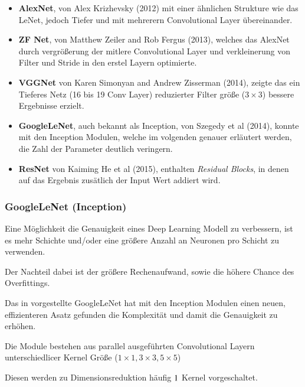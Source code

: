 \begin{itemize}
    \item \textbf{AlexNet}, von Alex Krizhevsky (2012) mit einer 
        ähnlichen Strukture wie das LeNet, jedoch Tiefer und 
        mit mehrerern Convolutional Layer übereinander.

    \item \textbf{ZF Net}, von Matthew Zeiler and Rob Fergus (2013),
        welches das AlexNet durch vergrößerung der 
        mitlere Convolutional Layer und verkleinerung 
        von Filter und Stride in den erstel Layern optimierte.

    \item \textbf{VGGNet} von Karen Simonyan and Andrew Zisserman (2014),
        zeigte das ein Tieferes Netz (16 bis 19 Conv Layer) reduzierter 
        Filter größe ($3\times3$) bessere Ergebnisse erzielt.    

    \item \textbf{GoogleLeNet}, auch bekannt als Inception, 
        von Szegedy et al (2014), konnte mit den Inception Modulen,
        welche im volgenden genauer erläutert werden, die Zahl der 
        Parameter deutlich veringern.

    \item \textbf{ResNet} von Kaiming He et al (2015), enthalten 
        \textit{Residual Blocks}, in denen auf das Ergebnis zusätlich
         der Input Wert addiert wird.
\end{itemize}



\subsubsection{GoogleLeNet (Inception)}

Eine Möglichkeit die Genauigkeit eines Deep Learning Modell 
zu verbessern, ist es mehr Schichte und/oder eine 
größere Anzahl an Neuronen pro Schicht zu verwenden.

Der Nachteil dabei ist der größere Rechenaufwand, sowie 
die höhere Chance des Overfittings.

Das in \cite{szegedyGoingDeeperConvolutions2014} vorgestellte GoogleLeNet hat mit den Inception 
Modulen einen neuen, effizienteren Asatz gefunden die 
Komplexität und damit die Genauigkeit zu erhöhen.

Die Module bestehen aus parallel ausgeführten 
Convolutional Layern unterschiedlicer Kernel 
Größe ($1\times1, 3\times3, 5\times5$)

Diesen werden zu Dimensionsreduktion häufig 
$1\time1$ Kernel vorgeschaltet.

